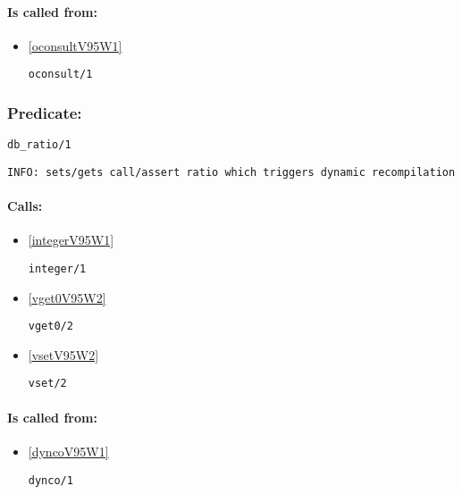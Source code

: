 \paragraph{Is called from:} 
\begin{itemize}
\item \ref{oconsultV95W1} 
\begin{verbatim}
oconsult/1
\end{verbatim}

\end{itemize}

\subsubsection{Predicate:} \label{dbV95WratioV95W1}

\begin{verbatim}
db_ratio/1
\end{verbatim}

{\small \begin{verbatim}
INFO: sets/gets call/assert ratio which triggers dynamic recompilation

\end{verbatim}}
\paragraph{Calls:} 
\begin{itemize}
\item \ref{integerV95W1} 
\begin{verbatim}
integer/1
\end{verbatim}

\item \ref{vget0V95W2} 
\begin{verbatim}
vget0/2
\end{verbatim}

\item \ref{vsetV95W2} 
\begin{verbatim}
vset/2
\end{verbatim}

\end{itemize}
\paragraph{Is called from:} 
\begin{itemize}
\item \ref{dyncoV95W1} 
\begin{verbatim}
dynco/1
\end{verbatim}

\end{itemize}

